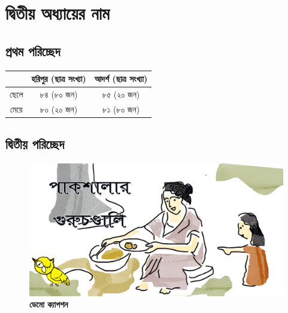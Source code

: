 \normalsize
{}
\chapter{দ্বিতীয় অধ্যায়ের নাম}

\section{প্রথম পরিচ্ছেদ}

\BanglaDummyText
\begin{table}[ht]
	\centering
	\begin{tabular}{|c|c|c|}
		\hline
		&	হরিপুর (ছাত্র সংখ্যা)	&	আদর্শ (ছাত্র সংখ্যা) \\
		\hline
		ছেলে	&	৮৪  (৮০ জন) 		&	৮৫ (২০ জন) \\
		\hline
		মেয়ে	&	৮০  (২০ জন) 		&	৮১  (৮০ জন)\\
		\hline
	\end{tabular}
\end{table}

\BanglaDummyText

\section{দ্বিতীয় পরিচ্ছেদ}

\BanglaDummyText

\begin{figure}
	\centering
	\includegraphics[width=\linewidth]{Images/DemoPic1.png}
	\caption{\small \textbf{ডেমো ক্যাপশন}}
\end{figure}

\BanglaDummyText
\begin{quotation}
	\textit{\BanglaDummyText}
\end{quotation}
\BanglaDummyText

